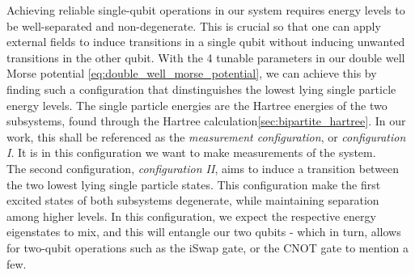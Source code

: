\documentclass{subfiles}
\begin{document}
Achieving reliable single-qubit operations in our system requires energy levels to be well-separated and non-degenerate. This is crucial so that one can apply external fields to induce transitions in a single qubit without inducing unwanted transitions in the other qubit. With the 4 tunable parameters in our double well Morse potential \eqref{eq:double_well_morse_potential}, we can achieve this by finding such a configuration that dinstinguishes the lowest lying single particle energy levels. The single particle energies are the Hartree energies of the two subsystems, found through the Hartree calculation\ref{sec:bipartite_hartree}. In our work, this shall be referenced as the \emph{measurement configuration}, or \emph{configuration I}. It is in this configuration we want to make measurements of the system. 
\\ 

The second configuration, \emph{configuration II}, aims to induce a transition between the two lowest lying single particle states. This configuration make the first excited states of both subsystems degenerate, while maintaining separation among higher levels. In this configuration, we expect the respective energy eigenstates to mix, and this will entangle our two qubits - which in turn, allows for two-qubit operations such as the iSwap gate, or the CNOT gate to mention a few\cite{leinonen2024coulomb, nichol2017high}.
\end{document}
